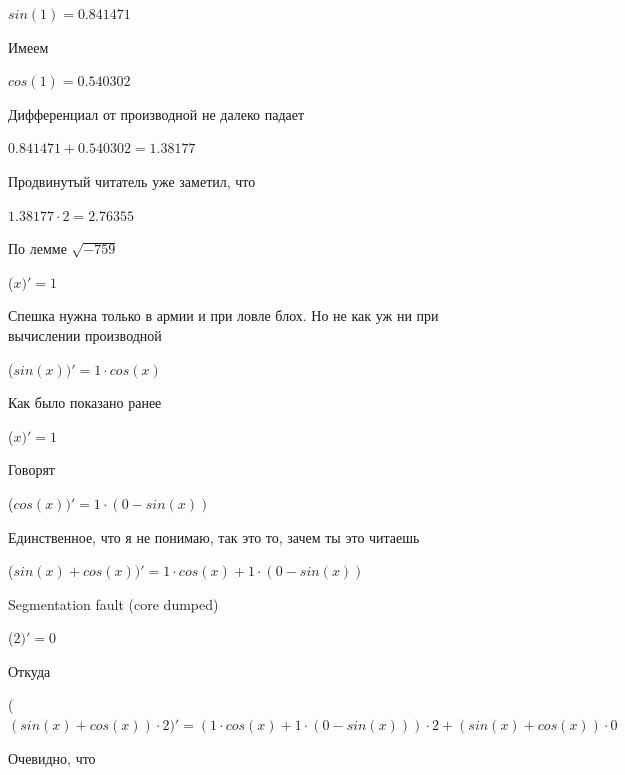 \documentclass[12pt,a4paper,fleqn]{article}
\begin{document}
\begin{center}
\end{center}
\begin{center}$sin(1) = 0.841471$\end{center}
Имеем

\begin{center}
\end{center}
\begin{center}$cos(1) = 0.540302$\end{center}
Дифференциал от производной не далеко падает\cite{link2}

\begin{center}
\end{center}
\begin{center}$0.841471+0.540302 = 1.38177$\end{center}
Продвинутый читатель уже заметил, что

\begin{center}
\end{center}
\begin{center}$1.38177 \cdot 2 = 2.76355$\end{center}
По лемме $\sqrt{-759}$
\begin{center}
 ($x)'
  = 1$\end{center}
Спешка нужна только в армии и при ловле блох. Но не как уж ни при вычислении производной\cite{link2}

\begin{center}
 ($sin(x))'
  = 1 \cdot cos(x)$\end{center}
Как было показано ранее

\begin{center}
 ($x)'
  = 1$\end{center}
Говорят

\begin{center}
 ($cos(x))'
  = 1 \cdot (0-sin(x))$\end{center}
Единственное, что я не понимаю, так это то, зачем ты это читаешь

\begin{center}
 ($sin(x)+cos(x))'
  = 1 \cdot cos(x)+1 \cdot (0-sin(x))$\end{center}
Segmentation fault (core dumped)

\begin{center}
 ($2)'
  = 0$\end{center}
Откуда

\begin{center}
 ($(sin(x)+cos(x)) \cdot 2)'
  = (1 \cdot cos(x)+1 \cdot (0-sin(x))) \cdot 2+(sin(x)+cos(x)) \cdot 0$\end{center}
Очевидно, что
\end{document}
